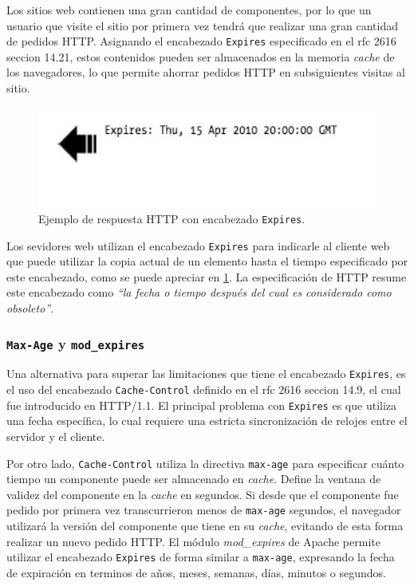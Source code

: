 \documentclass[a4paper,12pt]{report}
\begin{document}
Los sitios web contienen una gran cantidad de componentes, por lo que un usuario que visite el sitio por primera vez tendrá que realizar una gran cantidad de pedidos HTTP.
Asignando el encabezado \texttt{Expires} especificado en el rfc 2616 \cite{rfc2616} seccion 14.21, estos contenidos pueden ser almacenados en la memoria \emph{cache}
de los navegadores, lo que permite ahorrar pedidos HTTP en subsiguientes visitas al sitio.

\begin{figure}[h]
\centering
\includegraphics[width=1\textwidth]{figuras/hpws/expires.jpg}
  \caption{Ejemplo de respuesta HTTP con encabezado \texttt{Expires}.}
    \label{fig.expires}
\end{figure}

Los sevidores web utilizan el encabezado \texttt{Expires} para indicarle al cliente web que puede utilizar
la copia actual de un elemento hasta el tiempo especificado por este encabezado, como se puede apreciar en \ref{fig.expires}.
La especificación de HTTP resume este encabezado como \emph{``la fecha o tiempo después del cual es considerado como obsoleto''}.


\subsubsection{\texttt{Max-Age} y \texttt{mod\_expires}}

Una alternativa para superar las limitaciones que tiene el encabezado \texttt{Expires}, es el uso del encabezado \texttt{Cache-Control} definido en el rfc 2616 \cite{rfc2616} seccion 14.9, el cual
fue introducido en HTTP/1.1. El principal problema con \texttt{Expires} es que utiliza
una fecha específica, lo cual requiere una estricta sincronización de relojes entre el servidor y el cliente.

Por otro lado, \texttt{Cache-Control} utiliza la directiva \texttt{max-age} para especificar cuánto tiempo un componente puede ser almacenado en \emph{cache}.
Define la ventana de validez del componente en la \emph{cache} en segundos. Si desde que el componente fue pedido por primera vez transcurrieron menos de \texttt{max-age}
segundos, el navegador utilizará la versión del componente que tiene en su \emph{cache}, evitando de esta forma realizar un nuevo pedido HTTP.
El módulo \emph{mod\_expires} de Apache permite utilizar el encabezado \texttt{Expires} de forma similar a \texttt{max-age}, expresando la fecha de expiración en terminos de
años, meses, semanas, días, minutos o segundos.
\end{document}
